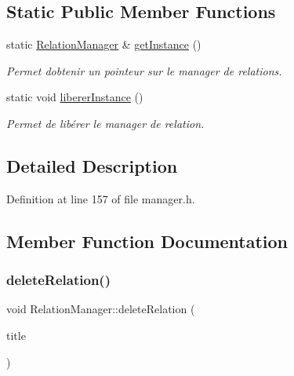 \subsection*{Static Public Member Functions}
\begin{DoxyCompactItemize}
\item 
\mbox{\label{class_relation_manager_a35c3622f29ccfbda84be848503041396}} 
static \hyperlink{class_relation_manager}{Relation\+Manager} \& \hyperlink{class_relation_manager_a35c3622f29ccfbda84be848503041396}{get\+Instance} ()
\begin{DoxyCompactList}\small\item\em Permet d\textquotesingle{}obtenir un pointeur sur le manager de relations. \end{DoxyCompactList}\item 
\mbox{\label{class_relation_manager_a64126ecfdd2046d9c9797e80427bcba3}} 
static void \hyperlink{class_relation_manager_a64126ecfdd2046d9c9797e80427bcba3}{liberer\+Instance} ()
\begin{DoxyCompactList}\small\item\em Permet de libérer le manager de relation. \end{DoxyCompactList}\end{DoxyCompactItemize}


\subsection{Detailed Description}


Definition at line 157 of file manager.\+h.



\subsection{Member Function Documentation}
\mbox{\label{class_relation_manager_a074413b3ed72a1342821e911c1fa3587}} 
\subsubsection{\texorpdfstring{delete\+Relation()}{deleteRelation()}}
{\footnotesize\ttfamily void Relation\+Manager\+::delete\+Relation (\begin{DoxyParamCaption}\item[{const Q\+String \&}]{title }\end{DoxyParamCaption})}



